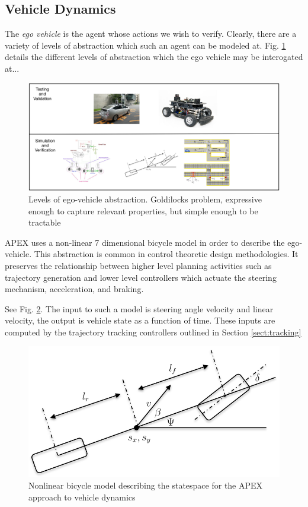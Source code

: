 \subsection{Vehicle Dynamics}
\label{sect:ego-vehicle}
The \emph{ego vehicle} is the agent whose actions we wish to verify. Clearly, there are a variety of levels of abstraction which such an agent can be modeled at. Fig. \ref{fig:abstraction} details the different levels of abstraction which the ego vehicle may be interogated at...

\begin{figure}
	\includegraphics[width=\textwidth]{figures/abstraction}
	\caption{Levels of ego-vehicle abstraction. Goldilocks problem, expressive enough to capture relevant properties, but simple enough to be tractable}
	\label{fig:abstraction}
\end{figure}
APEX uses a non-linear 7 dimensional bicycle model \cite{Rajamani2011} in order to describe the ego-vehicle. This abstraction is common in control theoretic design methodologies. It preserves the relationship between higher level planning activities such as trajectory generation and lower level controllers which actuate the steering mechanism, acceleration, and braking. 

See Fig. \ref{fig:bike}. 
The input to such a model is steering angle velocity and linear velocity, the output is vehicle state as a function of time. These inputs are computed by the trajectory tracking controllers outlined in Section \ref{sect:tracking}

\begin{figure}
	\centering
	\includegraphics[scale=.75]{figures/bicycle_model}
	\caption{Nonlinear bicycle model describing the statespace for the APEX approach to vehicle dynamics}
	\label{fig:bike}
\end{figure}

